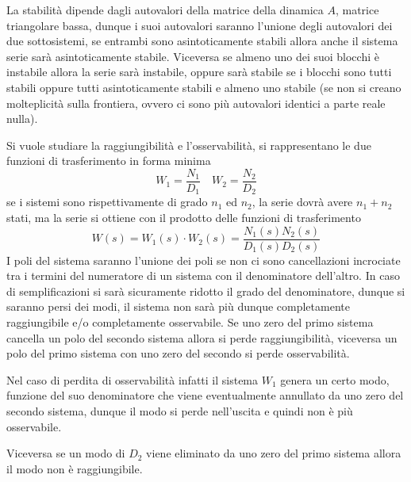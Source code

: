 La stabilità dipende dagli autovalori della matrice della dinamica $A$, matrice
triangolare bassa, dunque i suoi autovalori saranno l'unione degli autovalori
dei due sottosistemi, se entrambi sono asintoticamente stabili allora anche il
sistema serie sarà asintoticamente stabile.
Viceversa se almeno uno dei suoi blocchi è instabile allora la serie sarà
instabile, oppure sarà stabile se i blocchi sono tutti stabili oppure tutti
asintoticamente stabili e almeno uno stabile (se non si creano molteplicità
sulla frontiera, ovvero ci sono più autovalori identici a parte reale nulla).

Si vuole studiare la raggiungibilità e l'osservabilità, si rappresentano le due
funzioni di trasferimento in forma minima
$$
W_1 = \frac{N_1}{D_1} \quad W_2 = \frac{N_2}{D_2}
$$
se i sistemi sono rispettivamente di grado $n_1$ ed $n_2$, la serie dovrà avere
$n_1+n_2$ stati, ma la serie si ottiene con il prodotto delle funzioni di
trasferimento
$$
W(s) = W_1(s) \cdot W_2(s) = \frac{N_1(s)N_2(s)}{D_1(s)D_2(s)}
$$
I poli del sistema saranno l'unione dei poli se non ci sono cancellazioni
incrociate tra i termini del numeratore di un sistema con il denominatore
dell'altro.
In caso di semplificazioni si sarà sicuramente ridotto il grado del
denominatore, dunque si saranno persi dei modi, il sistema non sarà più dunque
completamente raggiungibile e/o completamente osservabile.
Se uno zero del primo sistema cancella un polo del secondo sistema allora si
perde raggiungibilità, viceversa un polo del primo sistema con uno zero del
secondo si perde osservabilità.

Nel caso di perdita di osservabilità infatti il sistema $W_1$ genera un certo
modo, funzione del suo denominatore che viene eventualmente annullato da uno
zero del secondo sistema, dunque il modo si perde nell'uscita e quindi non è
più osservabile.

Viceversa se un modo di $D_2$ viene eliminato da uno zero del primo sistema
allora il modo non è raggiungibile.


